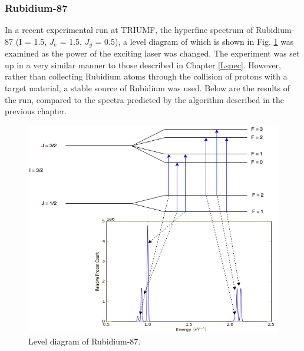 \subsubsection{Rubidium-87}
In a recent experimental run at TRIUMF, the hyperfine spectrum of Rubidium-87 (I = 1.5, $J_e$ = 1.5, $J_g$ = 0.5), a level diagram of which is shown in Fig. \ref{rb_diag} was examined as the power of the exciting laser was changed. The experiment was set up in a very similar manner to those described in Chapter \ref{Lspec}. However, rather than collecting Rubidium atoms through the collision of protons with a target material, a stable source of Rubidium was used. Below are the results of the run, compared to the spectra predicted by the algorithm described in the previous chapter.

\begin{figure}[h]
\includegraphics[width=\textwidth]{Graphics/rb-1.png}
\caption[Level-scheme of Rubidium-87.]{Level diagram of Rubidium-87.}
\label{rb_diag}
\end{figure}

